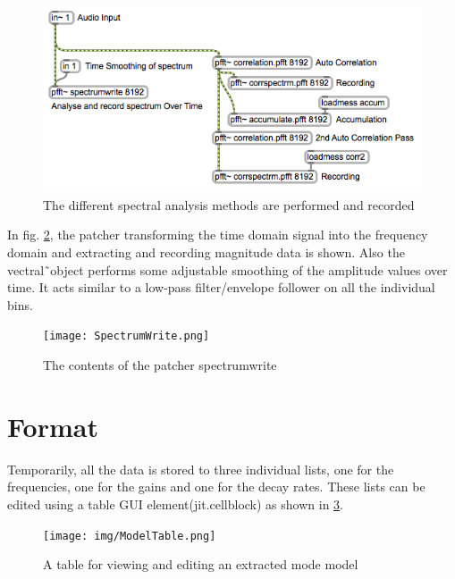 \begin{figure}[h]
	\begin{center}
		\includegraphics[width = 12cm]{img/SpectrumAnalysis.png}
		\caption{The different spectral analysis methods are performed and recorded}
		\label{fig:MaxSpectrumAnalysis}
	\end{center}
\end{figure}

In fig. \ref{fig:specwrite}, the patcher transforming the time domain signal into the frequency domain and extracting and recording magnitude data is shown. Also the vectral\~\ object performs some adjustable smoothing of the amplitude values over time. It acts similar to a low-pass filter/envelope follower on all the individual bins.  

\begin{figure}[h!]
	\begin{center}
		\texttt{[image: SpectrumWrite.png]}
		\caption{The contents of the patcher \glqq{}spectrumwrite\grqq{} }
		\label{fig:specwrite}
	\end{center}
\end{figure}



\section{Format} %
    \label{sec:format}
Temporarily, all the data is stored to three individual lists, one for the frequencies, one for the gains and one for the decay rates. These lists can be edited using a table GUI element(jit.cellblock) as shown in \ref{modelTable}.

 \begin{figure}[h]
 	\begin{center}
 		\texttt{[image: img/ModelTable.png]}
 		\caption{A table for viewing and editing an extracted mode model}
 		\label{modelTable}
 	\end{center}
 \end{figure}

